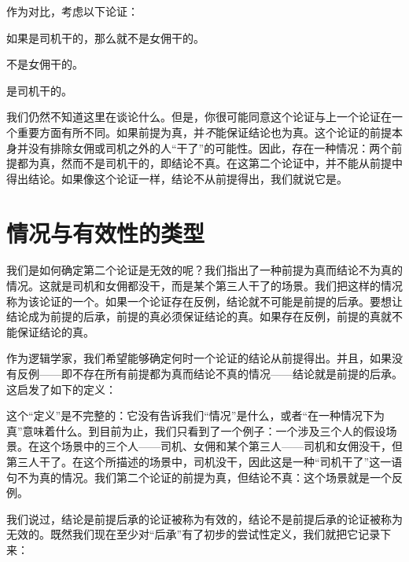 作为对比，考虑以下论证：

\begin{earg}\label{argMaidDriver}
	\item[] 如果是司机干的，那么就不是女佣干的。
	\item[] 不是女佣干的。
	\item[\texttherefore] 是司机干的。
\end{earg}

我们仍然不知道这里在谈论什么。但是，你很可能同意这个论证与上一个论证在一个重要方面有所不同。如果前提为真，并\emph{不}能保证结论也为真。这个论证的前提本身并没有排除女佣或司机之外的人“干了”的可能性。因此，存在一种情况：两个前提都为真，然而不是司机干的，即结论不真。在这第二个论证中，并不能从前提中得出结论。如果像这个论证一样，结论不从前提得出，我们就说它是。

\section{情况与有效性的类型}

我们是如何确定第二个论证是无效的呢？我们指出了一种前提为真而结论不为真的情况。这就是司机和女佣都没干，而是某个第三人干了的场景。我们把这样的情况称为该论证的一个。如果一个论证存在反例，结论就不可能是前提的后承。要想让结论成为前提的后承，前提的真必须保证结论的真。如果存在反例，前提的真就不能保证结论的真。

作为逻辑学家，我们希望能够确定何时一个论证的结论从前提得出。并且，如果没有反例——即不存在所有前提都为真而结论不真的情况——结论就是前提的后承。这启发了如下的定义：


这个“定义”是不完整的：它没有告诉我们“情况”是什么，或者“在一种情况下为真”意味着什么。到目前为止，我们只看到了一个例子：一个涉及三个人的假设场景。在这个场景中的三个人——司机、女佣和某个第三人——司机和女佣没干，但第三人干了。在这个所描述的场景中，司机没干，因此这是一种“司机干了”这一语句不为真的情况。我们第二个论证的前提为真，但结论不真：这个场景就是一个反例。

我们说过，结论是前提后承的论证被称为有效的，结论不是前提后承的论证被称为无效的。既然我们现在至少对“后承”有了初步的尝试性定义，我们就把它记录下来：


